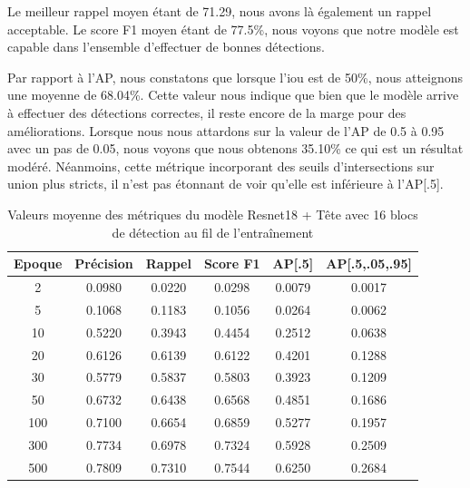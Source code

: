 Le meilleur rappel moyen étant de 71.29, nous avons là également un rappel acceptable. Le score F1 moyen étant de 77.5\%, nous voyons que notre modèle est capable dans l'ensemble d'effectuer de bonnes détections.

Par rapport à l'AP, nous constatons que lorsque l'\acrshort{iou} est de 50\%, nous atteignons une moyenne de 68.04\%. Cette valeur nous indique que bien que le modèle arrive à effectuer des détections correctes, il reste encore de la marge pour des améliorations. Lorsque nous nous attardons sur la valeur de l'AP de 0.5 à 0.95 avec un pas de 0.05, nous voyons que nous obtenons 35.10\% ce qui est un résultat modéré. Néanmoins, cette métrique incorporant des seuils d'intersections sur union plus stricts, il n'est pas étonnant de voir qu'elle est inférieure à l'AP[.5].

\begin{table}[!ht]
    \caption{Valeurs moyenne des métriques du modèle Resnet18 + Tête avec 16 blocs de détection au fil de l'entraînement}
    \label{tab:resnet18+head_16n_metrics_avg}
    \centering
    \begin{tabular}{ |c||c|c|c|c|c|  }
        \hline
        \rowcolor{gray!50}
        Epoque & Précision & Rappel & Score F1 & AP[.5] & AP[.5,.05,.95]\\
        \hline
        2 & 0.0980 & 0.0220 & 0.0298 & 0.0079 & 0.0017\\
        5 & 0.1068 & 0.1183 & 0.1056 & 0.0264 & 0.0062\\
        10 & 0.5220 & 0.3943  & 0.4454 & 0.2512 & 0.0638\\
        20 & 0.6126 & 0.6139 & 0.6122 & 0.4201 & 0.1288\\
        30 & 0.5779 & 0.5837 & 0.5803 & 0.3923 & 0.1209\\
        50 & 0.6732 & 0.6438 & 0.6568 & 0.4851 & 0.1686\\
        100 & 0.7100 & 0.6654 & 0.6859 & 0.5277 & 0.1957\\
        300 & 0.7734 & 0.6978 & 0.7324 & 0.5928 & 0.2509\\
        500 & 0.7809 & 0.7310 & 0.7544 & 0.6250 & 0.2684\\
        \hline
    \end{tabular}
\end{table}

